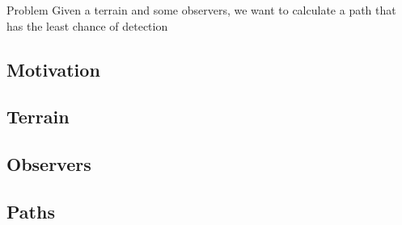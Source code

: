 \begin{frame}{Problem}
	\centering
	\Large
	Given a terrain and some observers, we want to calculate a path that has the least chance of detection

\end{frame}

\subsection{Motivation}


\subsection{Terrain}


\subsection{Observers}


\subsection{Paths}


